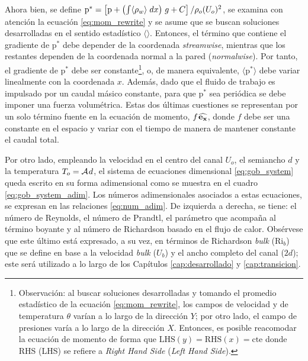 Ahora bien, se define $\text{p}^* = \left[ \text{p} + \left( \int \langle \rho_{w} \rangle \hspace{1mm} dx \right) \hspace{0.5mm} g + C \right] / \rho_o (U_o)^2 $, se examina con \linebreak atención la ecuación \ref{eq:mom_rewrite} y se asume que se buscan soluciones desarrolladas en el sentido estadístico $\langle \rangle$. Entonces, el término que contiene el gradiente de $\text{p}^*$ debe \linebreak depender de la coordenada \textit{streamwise}, mientras que los restantes dependen de la \linebreak coordenada normal a la pared (\textit{normalwise}). Por tanto, el gradiente de $\text{p}^*$ debe ser \linebreak constante\footnote{Observación: al buscar soluciones desarrolladas y tomando el promedio estadístico de la ecuación \ref{eq:mom_rewrite}, los campos de velocidad y de temperatura $\theta$ varían a lo largo de la dirección $Y$; por otro lado, el campo de presiones varía a lo largo de la dirección $X$. Entonces, es posible reacomodar la ecuación de momento de forma que $\text{LHS}(y)=\text{RHS}(x)=\text{cte}$ donde RHS (LHS) se refiere a \textit{Right Hand Side} (\textit{Left Hand Side}).}, o, de manera equivalente, $\langle \text{p}^* \rangle$ debe variar linealmente con la coordenada \linebreak $x$. Además, dado que el fluido de trabajo es impulsado por un caudal másico constante, para que $\text{p}^*$ sea periódica se debe imponer una fuerza volumétrica. Estas dos últimas cuestiones se representan por un solo término fuente en la ecuación de momento, $f \hspace{0.3mm} \mathbf{\widehat{e_x}}$, donde $f$ debe ser una constante en el espacio y variar con el tiempo de manera de mantener constante el caudal total.

Por otro lado, empleando la velocidad en el centro del canal $U_o$, el semiancho $d$ y la temperatura $T_o = \mathcal{A} \hspace{0.3mm} d $, el sistema de ecuaciones dimensional \ref{eq:gob_system} queda escrito en su forma adimensional como se muestra en el cuadro \ref{eq:gob_system_adim}. Los números adimensionales asociados a estas ecuaciones, se expresan en las relaciones \ref{eq:num_adim}. De izquierda a derecha, se tiene: el número de Reynolds, el número de Prandtl, el parámetro que acompaña al término boyante y al número de Richardson basado en el flujo de calor. Obsérvese que este último está expresado, a su vez, en términos de Richardson \textit{bulk} ($\text{Ri}_b$) que se define en base a la velocidad \textit{bulk} ($U_b$) y el ancho completo del canal ($2d$); este será utilizado a lo largo de los Capítulos \ref{cap:desarrollado} y \ref{cap:transicion}.


